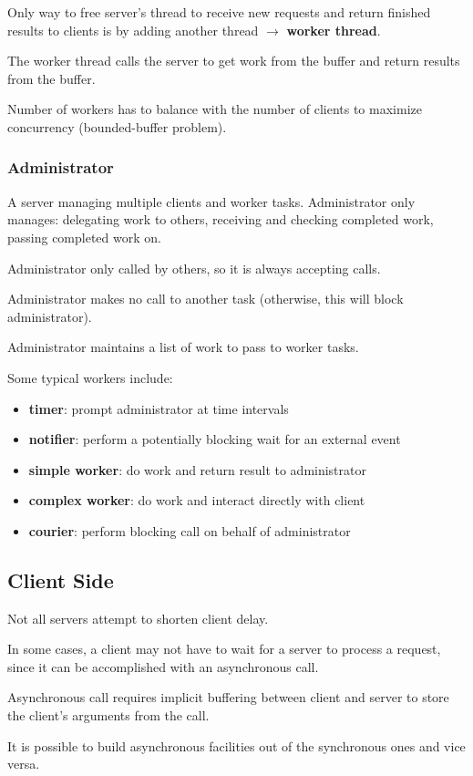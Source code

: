 \documentclass[11pt]{article}
\begin{document}
Only way to free server's thread to receive new requests and return finished
results to clients is by adding another thread \(\to\) \textbf{worker thread}.

The worker thread calls the server to get work from the buffer and return
results from the buffer.

Number of workers has to balance with the number of clients to maximize
concurrency (bounded-buffer problem).
\subsubsection{Administrator}
\label{sec:org6499acc}
A server managing multiple clients and worker tasks.
Administrator only manages: delegating work to others, receiving and checking
completed work, passing completed work on.

Administrator only called by others, so it is always accepting calls.

Administrator makes no call to another task (otherwise, this will block
administrator).

Administrator maintains a list of work to pass to worker tasks.

Some typical workers include:
\begin{itemize}
\item \textbf{timer}: prompt administrator at time intervals
\item \textbf{notifier}: perform a potentially blocking wait for an external event
\item \textbf{simple worker}: do work and return result to administrator
\item \textbf{complex worker}: do work and interact directly with client
\item \textbf{courier}: perform blocking call on behalf of administrator
\end{itemize}
\subsection{Client Side}
\label{sec:orgd680c54}
Not all servers attempt to shorten client delay.

In some cases, a client may not have to wait for a server to process a
request, since it can be accomplished with an asynchronous call.

Asynchronous call requires implicit buffering between client and
server to store the client's arguments from the call.

It is possible to build asynchronous facilities out of the
synchronous ones and vice versa.
\end{document}
